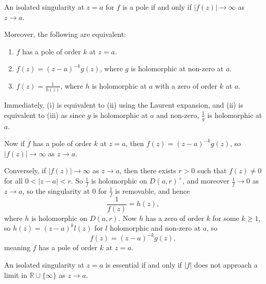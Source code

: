 \documentclass[12pt]{article}
\begin{document}
\begin{proposition}
	An isolated singularity at $z = a$ for $f$ is a pole if and only if $|f(z)| \to \infty$ as $z \to a$.

	Moreover, the following are equivalent:
	\begin{enumerate}[\normalfont(i)]
		\item $f$ has a pole of order $k$ at $z = a$.
		\item $f(z) = (z-a)^{-k}g(z)$, where $g$ is holomorphic at non-zero at $a$.
		\item $f(z) = \frac{1}{h(z)}$, where $h$ is holomorphic at $a$ with a zero of order $k$ at $a$.
	\end{enumerate}
\end{proposition}

\begin{proofbox}
	Immediately, (i) is equivalent to (ii) using the Laurent expansion, and (ii) is equivalent to (iii) as since $g$ is holomorphic at $a$ and non-zero, $\frac{1}{g}$ is holomorphic at $a$.

	Now if $f$ has a pole of order $k$ at $z = a$, then $f(z) = (z - a)^{-k}g(z)$, so $|f(z)| \to \infty$ as $z \to a$.

	Conversely, if $|f(z)| \to \infty$ as $z \to a$, then there exists $r > 0$ such that $f(z) \neq 0$ for all $0 < |z-a| < r$. So $\frac{1}{f}$ is holomorphic on $D(a, r)^{\times}$, and moreover $\frac{1}{f} \to 0$ as $z \to a$, so the singularity at $0$ for $\frac{1}{f}$ is removable, and hence
	\[
	\frac{1}{f(z)} = h(z),
	\]
	where $h$ is holomorphic on $D(a, r)$. Now $h$ has a zero of order $k$ for some $k \geq 1$, so $h(z) = (z - a)^{k}l(z)$ for $l$ holomorphic and non-zero at $a$, so
	\[
	f(z) = (z - a)^{-k}g(z),
	\]
	meaning $f$ has a pole of order $k$ at $z = a$.
\end{proofbox}

\begin{corollary}
	An isolated singularity at $z = a$ is essential if and only if $|f|$ does not approach a limit in $\mathbb{R} \cup \{\infty\}$ as $z \to a$.
\end{corollary}

\newpage

\printindex
\end{document}
